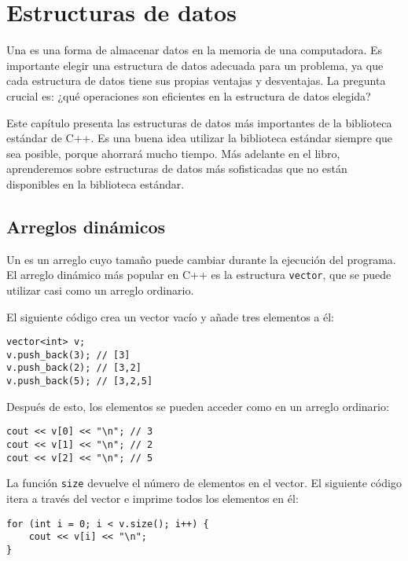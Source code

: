 \chapter{Estructuras de datos}


Una  es una forma de almacenar
datos en la memoria de una computadora.
Es importante elegir una estructura de datos adecuada
para un problema,
ya que cada estructura de datos tiene sus propias
ventajas y desventajas.
La pregunta crucial es: ¿qué operaciones
son eficientes en la estructura de datos elegida?

Este capítulo presenta las estructuras de datos más importantes
de la biblioteca estándar de C++.
Es una buena idea utilizar la biblioteca estándar
siempre que sea posible,
porque ahorrará mucho tiempo.
Más adelante en el libro, aprenderemos sobre estructuras de datos más sofisticadas
que no están disponibles
en la biblioteca estándar.

\section{Arreglos dinámicos}


Un  es un arreglo cuyo
tamaño puede cambiar durante la ejecución
del programa.
El arreglo dinámico más popular en C++ es
la estructura \texttt{vector},
que se puede utilizar casi como un arreglo ordinario.

El siguiente código crea un vector vacío y
añade tres elementos a él:

\begin{lstlisting}
vector<int> v;
v.push_back(3); // [3]
v.push_back(2); // [3,2]
v.push_back(5); // [3,2,5]
\end{lstlisting}

Después de esto, los elementos se pueden acceder como en un arreglo ordinario:

\begin{lstlisting}
cout << v[0] << "\n"; // 3
cout << v[1] << "\n"; // 2
cout << v[2] << "\n"; // 5
\end{lstlisting}

La función \texttt{size} devuelve el número de elementos en el vector.
El siguiente código itera a través
del vector e imprime todos los elementos en él:

\begin{lstlisting}
for (int i = 0; i < v.size(); i++) {
    cout << v[i] << "\n";
}
\end{lstlisting}

